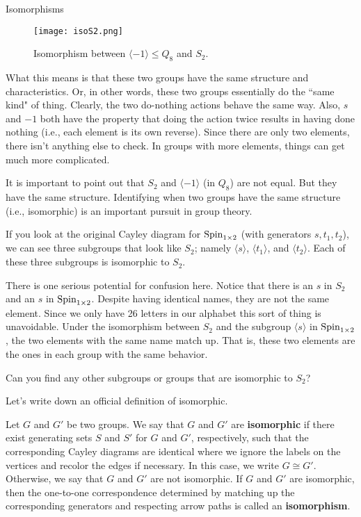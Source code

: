 \begin{section}{Isomorphisms}
\begin{figure}\label{fig:isoS2}
\begin{center}
\texttt{[image: isoS2.png]}
\end{center}
\caption{Isomorphism between \(\langle -1\rangle\leq Q_8\) and \(S_2\).}
\end{figure}

What this means is that these two groups have the same structure and characteristics.  Or, in other words, these two groups essentially do the ``same kind" of thing.  Clearly, the two do-nothing actions behave the same way.  Also, \(s\) and \(-1\) both have the property that doing the action twice results in having done nothing (i.e., each element is its own reverse).  Since there are only two elements, there isn't anything else to check.  In groups with more elements, things can get much more complicated.  

It is important to point out that \(S_2\) and \(\langle -1\rangle\) (in \(Q_8\)) are not equal.  But they have the same structure.  Identifying when two groups have the same structure (i.e., isomorphic) is an important pursuit in group theory.

If you look at the original Cayley diagram for \(\operatorname{Spin}_{1\times 2}\) (with generators \(s, t_1, t_2\)), we can see three subgroups that look like \(S_2\); namely \(\langle s\rangle\), \(\langle t_1\rangle\), and \(\langle t_2\rangle\).  Each of these three subgroups is isomorphic to \(S_2\).  

There is one serious potential for confusion here.  Notice that there is an \(s\) in \(S_2\) and an \(s\) in \(\operatorname{Spin}_{1\times 2}\).  Despite having identical names, they are not the same element.  Since we only have 26 letters in our alphabet this sort of thing is unavoidable.  Under the isomorphism between \(S_2\) and the subgroup \(\langle s\rangle\) in \(\operatorname{Spin}_{1\times 2}\), the two elements with the same name match up.  That is, these two elements are the ones in each group with the same behavior.

\begin{exercise}
Can you find any other subgroups or groups that are isomorphic to \(S_2\)?
\end{exercise}

Let's write down an official definition of isomorphic.

\begin{definition}
Let \(G\) and \(G'\) be two groups.  We say that \(G\) and \(G'\) are \textbf{isomorphic} if there exist generating sets \(S\) and \(S'\) for \(G\) and \(G'\), respectively, such that the corresponding Cayley diagrams are identical where we ignore the labels on the vertices and recolor the edges if necessary.  In this case, we write \(G\cong G'\).  Otherwise, we say that \(G\) and \(G'\) are not isomorphic.  If \(G\) and \(G'\) are isomorphic, then the one-to-one correspondence determined by matching up the corresponding generators and respecting arrow paths is called an \textbf{isomorphism}.
\end{definition}


\end{section}
